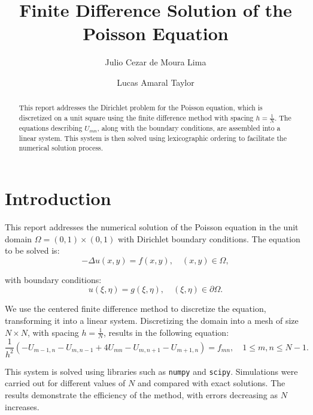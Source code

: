 \documentclass[aps,amsmath,amssymb,floatfix]{revtex4}
\begin{document}
\title{Finite Difference Solution of the Poisson Equation}
\author{Julio Cezar de Moura Lima}
\author{Lucas Amaral Taylor}
\begin{abstract}
	\baselineskip 11pt
	\begin{center}
		This report addresses the Dirichlet problem for the Poisson equation, which is discretized on a unit square using the finite difference method with spacing $h = \frac{1}{N}$. The equations describing $U_{mn}$, along with the boundary conditions, are assembled into a linear system. This system is then solved using lexicographic ordering to facilitate the numerical solution process.
	\end{center}
\end{abstract}

\maketitle

\section{Introduction}
This report addresses the numerical solution of the Poisson equation in the unit domain $\Omega = (0,1) \times (0,1)$ with Dirichlet boundary conditions. The equation to be solved is:
\begin{equation*}
	-\Delta u(x, y) = f(x, y), \quad (x, y) \in \Omega,
\end{equation*}

with boundary conditions:
\begin{equation*}
	u(\xi, \eta) = g(\xi, \eta), \quad (\xi, \eta) \in \partial\Omega.
\end{equation*}

We use the centered finite difference method to discretize the equation, transforming it into a linear system. Discretizing the domain into a mesh of size $N \times N$, with spacing $h = \frac{1}{N}$, results in the following equation:
\begin{equation*}
	\frac{1}{h^2}(-U_{m-1,n} - U_{m,n-1} + 4U_{mn} - U_{m,n+1} - U_{m+1,n}) = f_{mn}, \quad 1 \leq m,n \leq N-1.
\end{equation*}

This system is solved using libraries such as \texttt{numpy} and \texttt{scipy}. Simulations were carried out for different values of $N$ and compared with exact solutions. The results demonstrate the efficiency of the method, with errors decreasing as $N$ increases.
\end{document}
